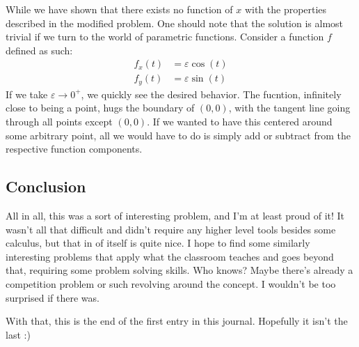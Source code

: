 While we have shown that there exists no function of \( x \) with the
properties described in the modified problem. One should note that the solution
is almost trivial if we turn to the world of parametric functions. Consider a function \( f \) defined as such:
\begin{align*}
    f_x \left( t \right) &= \varepsilon \cos{\left( t \right)} \\
    f_y \left( t \right) &= \varepsilon \sin{\left( t \right)}
\end{align*}
If we take \( \varepsilon \to 0^+ \), we quickly see the desired behavior. The
fucntion, infinitely close to being a point, hugs the boundary of \( \left( 0,
0 \right) \), with the tangent line going through all points except \( \left(
0, 0 \right) \). If we wanted to have this centered around some arbitrary
point, all we would have to do is simply add or subtract from the respective
function components.

\subsection{Conclusion}

All in all, this was a sort of interesting problem, and I'm at least proud of
it! It wasn't all that difficult and didn't require any higher level tools
besides some calculus, but that in of itself is quite nice. I hope to find some
similarly interesting problems that apply what the classroom teaches and goes
beyond that, requiring some problem solving skills. Who knows? Maybe there's
already a competition problem or such revolving around the concept. I wouldn't
be too surprised if there was.

With that, this is the end of the first entry in this journal. Hopefully it isn't the last :)
